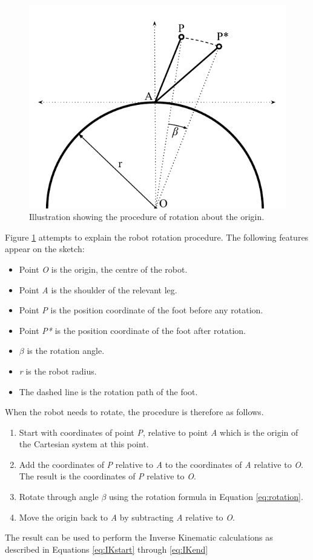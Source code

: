 \FloatBarrier
\begin{figure}[h]
\centering
\includegraphics[scale = 1]{pics/Body_Layout_6.pdf}
\caption{Illustration showing the procedure of rotation about the origin.}
\label{fig:Body_layout_6}
\end{figure}
\FloatBarrier

Figure \ref{fig:Body_layout_6} attempts to explain the robot rotation procedure. The following features appear on the sketch:
\begin{itemize}
\item Point \textit{O} is the origin, the centre of the robot.
\item Point \textit{A} is the shoulder of the relevant leg.
\item Point \textit{P} is the position coordinate of the foot before any rotation.
\item Point \textit{P*} is the position coordinate of the foot after rotation.
\item $\beta$ is the rotation angle.
\item \textit{r} is the robot radius.
\item The dashed line is the rotation path of the foot.
\end{itemize}

When the robot needs to rotate, the procedure is therefore as follows.
\begin{enumerate}
\item Start with coordinates of point \textit{P}, relative to point \textit{A} which is the origin of the Cartesian system at this point.
\item Add the coordinates of \textit{P} relative to \textit{A} to the coordinates of \textit{A} relative to \textit{O}. The result is the  coordinates of \textit{P} relative to \textit{O}.
\item Rotate through angle $\beta$ using the rotation formula in Equation \ref{eq:rotation}.
\item Move the origin back to \textit{A} by subtracting \textit{A} relative to \textit{O}.
\end{enumerate}

The result can be used to perform the Inverse Kinematic calculations as described in Equations \ref{eq:IKstart} through \ref{eq:IKend}